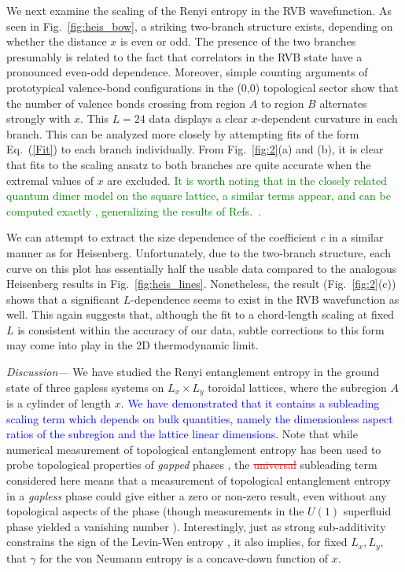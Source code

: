 \documentclass[prb,aps,twocolumn,floatfix,amsmath,amssymb,superscriptaddress,tightenlines]{revtex4}
\begin{document}
We next examine the scaling of the Renyi entropy in the RVB wavefunction.
As seen in Fig.~\ref{fig:heis_bow}, a striking two-branch structure exists, depending on whether the distance $x$ is even or odd.
The presence of the two branches presumably is related to the fact that correlators in the RVB state have a pronounced even-odd dependence. Moreover, simple counting arguments of prototypical valence-bond configurations in the (0,0) topological sector \cite{RVB1,RVB2} show that the number of valence bonds crossing from region $A$ to region $B$ alternates strongly with $x$.  This $L=24$ data displays a clear $x$-dependent curvature in each branch. This can be analyzed more closely by attempting fits of the form Eq.~(\ref{Fit}) to each branch individually. From Fig.~{\ref{fig:2}}(a) and (b), it is clear that fits to the scaling
ansatz to both branches are quite accurate when the extremal values of
$x$ are excluded. 
\textcolor{green}{It is worth noting that in the closely related quantum dimer
model on the square lattice, a similar terms appear, and can be computed exactly \cite{Stephan12}, generalizing the results of Refs.\ . }


We can attempt to
extract the size dependence of the coefficient $c$ in a similar
manner as for Heisenberg. Unfortunately, due to the two-branch structure, each curve on this plot has
essentially half the usable data compared to the analogous Heisenberg
results in Fig.~\ref{fig:heis_lines}.  Nonetheless,  the result (Fig.~\ref{fig:2}(c)) shows that a significant
$L$-dependence seems to exist in the RVB wavefunction as well.  This
again suggests that, although the fit to a chord-length scaling at
fixed $L$ is consistent within the accuracy of our data, subtle
corrections to this form may come into play in the 2D thermodynamic
limit. 
\smallskip

{\it  Discussion---} We have studied the Renyi entanglement entropy in the ground state of three gapless systems on $L_x\times L_y$ toroidal lattices, where the subregion $A$ is a cylinder of length $x$.  
\textcolor{blue}{We have demonstrated that it contains a subleading scaling term which depends on bulk quantities, namely the dimensionless aspect ratios of the subregion and the lattice linear dimensions.}
Note that while numerical measurement of topological entanglement entropy \cite{LW,KP} has been used to probe topological properties of {\it gapped} phases \cite{isakov}, the \textcolor{red}{\sout{universal}} subleading term considered here means that a measurement of topological entanglement entropy in a {\it gapless} phase could give either a zero or non-zero result, even without any topological aspects of the phase (though measurements in the $U(1)$ superfluid phase yielded a vanishing number \cite{isakov}).  
Interestingly, just as strong sub-additivity constrains the sign of the Levin-Wen entropy \cite{LW}, it also implies, for fixed $L_x,L_y$, that $\gamma$ for the von Neumann entropy is a concave-down function of $x$.
\end{document}
